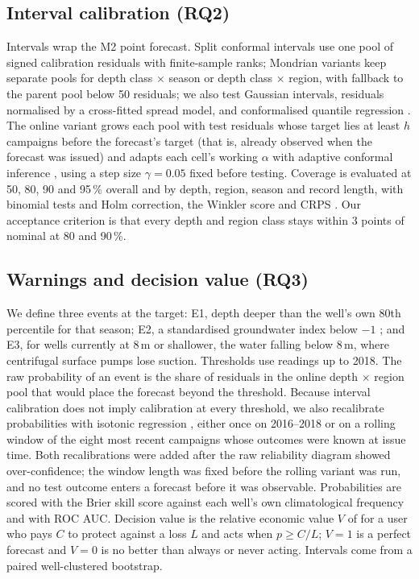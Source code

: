 \documentclass[hess, manuscript]{copernicus}
\begin{document}
\subsection{Interval calibration (RQ2)}
Intervals wrap the M2 point forecast. Split conformal intervals \citep{lei2018distribution} use one pool of signed calibration
residuals with finite-sample ranks; Mondrian variants keep separate pools for depth class $\times$ season or depth class
$\times$ region, with fallback to the parent pool below 50 residuals; we also test Gaussian intervals, residuals normalised by
a cross-fitted spread model, and conformalised quantile regression \citep{romano2019cqr}. The online variant grows each pool
with test residuals whose target lies at least $h$ campaigns before the forecast's target (that is, already observed when the
forecast was issued) and adapts each cell's working $\alpha$ with adaptive conformal inference \citep{gibbs2021aci}, using a
step size $\gamma=0.05$ fixed before testing. Coverage is evaluated at 50, 80, 90 and 95\,\% overall and by depth, region,
season and record length, with binomial tests and Holm correction, the Winkler score and CRPS \citep{gneiting2007scoring}.
Our acceptance criterion is that every depth and region class stays within 3 points of nominal at 80 and 90\,\%.

\subsection{Warnings and decision value (RQ3)}
We define three events at the target: E1, depth deeper than the well's own 80th percentile for that season; E2, a standardised
groundwater index below $-1$ \citep{bloomfield2013sgi}; and E3, for wells currently at 8\,m or shallower, the water falling
below 8\,m, where centrifugal surface pumps lose suction. Thresholds use readings up to 2018. The raw probability of an event
is the share of residuals in the online depth $\times$ region pool that would place the forecast beyond the threshold. Because
interval calibration does not imply calibration at every threshold, we also recalibrate probabilities with isotonic regression
\citep{zadrozny2002isotonic}, either once on 2016--2018 or on a rolling window of the eight most recent campaigns whose outcomes
were known at issue time. Both recalibrations were added after the raw reliability diagram showed over-confidence; the
window length was fixed before the rolling variant was run, and no test outcome enters a forecast before it was observable. Probabilities are scored with the Brier skill score \citep{brier1950verification} against each well's
own climatological frequency and with ROC AUC. Decision value is the relative economic value $V$ of \citet{richardson2000value}
for a user who pays $C$ to protect against a loss $L$ and acts when $p \ge C/L$; $V=1$ is a perfect forecast and $V=0$ is no
better than always or never acting. Intervals come from a paired well-clustered bootstrap.
\end{document}
